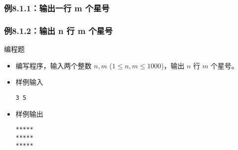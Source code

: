 \begin{frame}[fragile]
    \frametitle{例8.1.1：输出一行 m 个星号}

\end{frame}

\begin{frame}[fragile]
    \frametitle{例8.1.2：输出 n 行 m 个星号}


    \begin{exampleblock}{编程题}

        \begin{itemize}
            \item 编写程序，输入两个整数 $n,m$ ($1 \le n,m \le 1000$)，输出 $n$ 行 $m$ 个星号。

            \item 样例输入

                \lstinline|3 5|

            \item 样例输出

                \lstinline|*****|\\
                \lstinline|*****|\\
                \lstinline|*****|

        \end{itemize}

    \end{exampleblock}

\end{frame}

